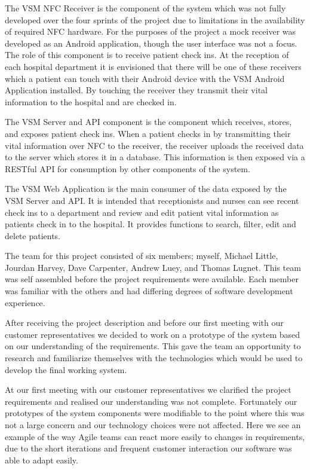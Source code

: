 \documentclass[conference]{IEEEtran}
\begin{document}
The VSM NFC Receiver is the component of the system which was not fully
developed over the four sprints of the project due to limitations in the
availability of required NFC hardware. For the purposes of the project a mock
receiver was developed as an Android application, though the user interface was
not a focus. The role of this component is to receive patient check ins. At the
reception of each hospital department it is envisioned that there will be one of
these receivers which a patient can touch with their Android device with the VSM
Android Application installed. By touching the receiver they transmit their
vital information to the hospital and are checked in.

The VSM Server and API component is the component which receives, stores, and
exposes patient check ins. When a patient checks in by transmitting their vital
information over NFC to the receiver, the receiver uploads the received data to
the server which stores it in a database. This information is then exposed via a
RESTful API for consumption by other components of the system.

The VSM Web Application is the main consumer of the data exposed by the VSM
Server and API. It is intended that receptionists and nurses can see recent
check ins to a department and review and edit patient vital information as
patients check in to the hospital. It provides functions to search, filter, edit
and delete patients.

The team for this project consisted of six members; myself, Michael Little,
Jourdan Harvey, Dave Carpenter, Andrew Luey, and Thomas Lugnet. This team was
self assembled before the project requirements were available. Each member was
familiar with the others and had differing degrees of software development
experience.

After receiving the project description and before our first meeting with our
customer representatives we decided to work on a prototype of the system based
on our understanding of the requirements. This gave the team an opportunity to
research and familiarize themselves with the technologies which would be used to
develop the final working system.

At our first meeting with our customer representatives we clarified the project
requirements and realised our understanding was not complete. Fortunately our
prototypes of the system components were modifiable to the point where this was
not a large concern and our technology choices were not affected. Here we see an
example of the way Agile teams can react more easily to changes in requirements,
due to the short iterations and frequent customer interaction our software was
able to adapt easily.
\end{document}
